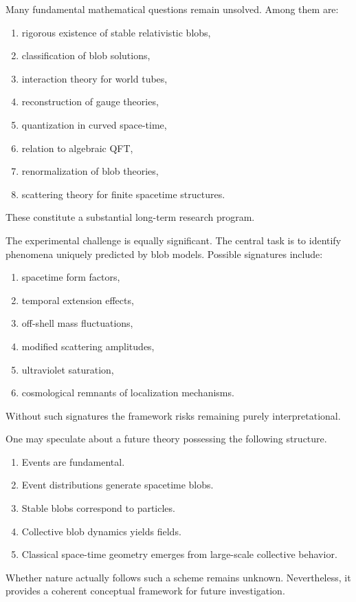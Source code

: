 Many fundamental mathematical questions remain unsolved.
Among them are:
\begin{enumerate}
\item rigorous existence of stable relativistic blobs,
\item classification of blob solutions,
\item interaction theory for world tubes,
\item reconstruction of gauge theories,
\item quantization in curved space-time,
\item relation to algebraic QFT,
\item renormalization of blob theories,
\item scattering theory for finite spacetime structures.
\end{enumerate}
These constitute a substantial long-term research program.

The experimental challenge is equally significant.
The central task is to identify phenomena uniquely predicted by blob
models.
Possible signatures include:
\begin{enumerate}
\item spacetime form factors,
\item temporal extension effects,
\item off-shell mass fluctuations,
\item modified scattering amplitudes,
\item ultraviolet saturation,
\item cosmological remnants of localization mechanisms.
\end{enumerate}
Without such signatures the framework risks remaining purely
interpretational.

One may speculate about a future theory possessing the following
structure.
\begin{enumerate}
\item Events are fundamental.
\item Event distributions generate spacetime blobs.
\item Stable blobs correspond to particles.
\item Collective blob dynamics yields fields.
\item Classical space-time geometry emerges from large-scale collective
behavior.
\end{enumerate}
Whether nature actually follows such a scheme remains unknown.
Nevertheless, it provides a coherent conceptual framework for future
investigation.

